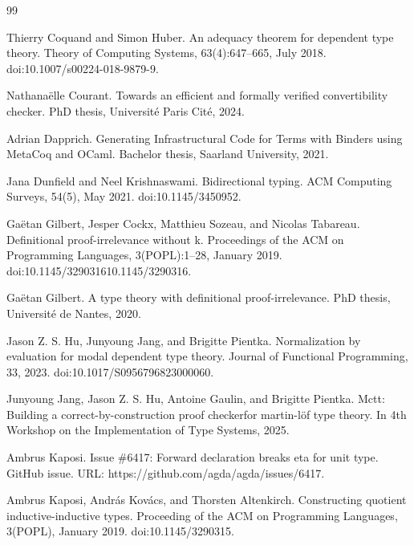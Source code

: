 \documentclass[10pt,a4paper]{amsart}
\begin{document}
\begin{thebibliography}{99}
\par\noindent  [17]  Thierry Coquand and Simon Huber.  An adequacy theorem for dependent type theory.  Theory of Computing Systems, 63(4):647–665, July 2018.  doi:10.1007/s00224-018-9879-9.  
 
\par\noindent  [18]  Nathanaëlle Courant.  Towards an efficient and formally verified convertibility checker.  PhD thesis, Université Paris Cité, 2024.  
 
\par\noindent  [19]  Adrian Dapprich.  Generating Infrastructural Code for Terms with Binders using MetaCoq and OCaml.  Bachelor thesis, Saarland University, 2021.  
 
\par\noindent  [20]  Jana Dunfield and Neel Krishnaswami.  Bidirectional typing.  ACM Computing Surveys, 54(5), May 2021.  doi:10.1145/3450952.  
 
\par\noindent  [21]  Gaëtan Gilbert, Jesper Cockx, Matthieu Sozeau, and Nicolas Tabareau.  Definitional proof-irrelevance without k.  Proceedings of the ACM on Programming Languages, 3(POPL):1–28, January 2019.  doi:10.1145/329031610.1145/3290316.  
 
\par\noindent  [22]  Gaëtan Gilbert.  A type theory with definitional proof-irrelevance.  PhD thesis, Université de Nantes, 2020.  
 
\par\noindent  [23]  Jason Z. S. Hu, Junyoung Jang, and Brigitte Pientka.  Normalization by evaluation for modal dependent type theory.  Journal of Functional Programming, 33, 2023.  doi:10.1017/S0956796823000060.  
 
\par\noindent  [24]  Junyoung Jang, Jason Z. S. Hu, Antoine Gaulin, and Brigitte Pientka.  Mctt: Building a correct-by-construction proof checkerfor martin-löf type theory.  In 4th Workshop on the Implementation of Type Systems, 2025.  
 
\par\noindent  [25]  Ambrus Kaposi.  Issue \#6417: Forward declaration breaks eta for unit type.  GitHub issue.  URL: https://github.com/agda/agda/issues/6417.  
 
\par\noindent  [26]  Ambrus Kaposi, András Kovács, and Thorsten Altenkirch.  Constructing quotient inductive-inductive types.  Proceeding of the ACM on Programming Languages, 3(POPL), January 2019.  doi:10.1145/3290315.  
 

\end{thebibliography}
\end{document}
